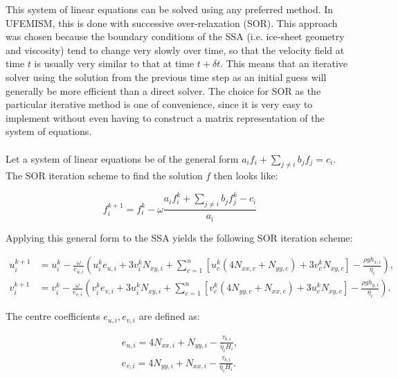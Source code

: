 \documentclass{article}
\begin{document}
This system of linear equations can be solved using any preferred method. In UFEMISM, this is done with successive over-relaxation (SOR). This approach was chosen because the boundary conditions of the SSA (i.e. ice-sheet geometry and viscosity) tend to change very slowly over time, so that the velocity field at time $t$ is usually very similar to that at time $t+\delta t$. This means that an iterative solver using the solution from the previous time step as an initial guess will generally be more efficient than a direct solver. The choice for SOR as the particular iterative method is one of convenience, since it is very easy to implement without even having to construct a matrix representation of the system of equations.\\
\\
Let a system of linear equations be of the general form $ a_i f_i + \sum_{j \neq i} b_j f_j = c_i$. The SOR iteration scheme to find the solution $f$ then looks like:

\begin{equation}
f_i^{k+1} = f_i^k - \omega \frac{a_i f_i^k + \sum_{j \neq i} b_j f_j^k - c_i}{a_i}
\end{equation}

Applying this general form to the SSA yields the following SOR iteration scheme:

\begin{align}
u_i^{k+1} &= u_i^k - \frac{\omega}{e_{u,i}} \left( u_i^k e_{u,i} + 3 v_i^k N_{xy,i} +
\sum_{c=1}^n \left[ u_c^k \left( 4 N_{xx,c} + N_{yy,c} \right) + 3 v_c^k N_{xy,c} \right] - \frac{\rho g h_{x,i}}{\overline{\eta_i}} \right), \\
v_i^{k+1} &= v_i^k - \frac{\omega}{e_{v,i}} \left( v_i^k e_{v,i} + 3 u_i^k N_{xy,i} +
\sum_{c=1}^n \left[ v_c^k \left( 4 N_{yy,c} + N_{xx,c} \right) + 3 u_c^k N_{xy,c} \right] - \frac{\rho g h_{y,i}}{\overline{\eta_i}} \right).
\end{align}

The centre coefficients $e_{u,i}, e_{v,i}$ are defined as:

\begin{align}
e_{u,i} = 4 N_{xx,i} + N_{yy,i} - \frac{\tau_{b,i}}{\overline{\eta_i} H_i}, \\
e_{v,i} = 4 N_{yy,i} + N_{xx,i} - \frac{\tau_{b,i}}{\overline{\eta_i} H_i}.
\end{align}
\end{document}
